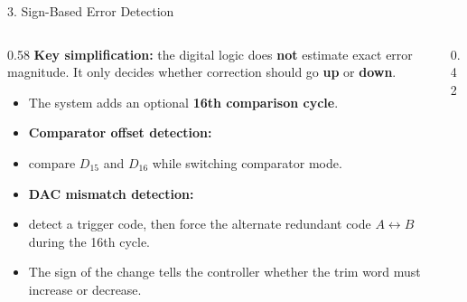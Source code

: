 \documentclass[aspectratio=169]{beamer}
\begin{document}
\begin{frame}{3. Sign-Based Error Detection}
  \begin{columns}[T]
    \begin{column}{0.58\textwidth}
      \small
      \textbf{Key simplification:} the digital logic does \textbf{not} estimate exact error magnitude. It only decides whether correction should go \textbf{up} or \textbf{down}.

      \vspace{1mm}
      \begin{itemize}
        \item The system adds an optional \textbf{16th comparison cycle}.
        \item \textbf{Comparator offset detection:}
        \item compare \(D_{15}\) and \(D_{16}\) while switching comparator mode.
        \item \textbf{DAC mismatch detection:}
        \item detect a trigger code, then force the alternate redundant code \(A \leftrightarrow B\) during the 16th cycle.
        \item The sign of the change tells the controller whether the trim word must increase or decrease.
      \end{itemize}
    \end{column}
    \begin{column}{0.42\textwidth}
      \centering
    \end{column}
  \end{columns}
\end{frame}
\end{document}
